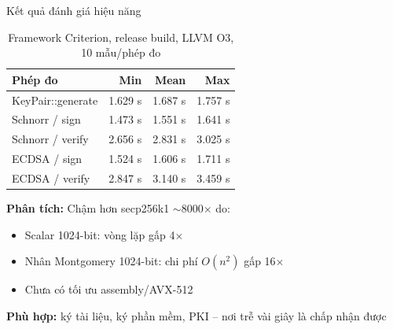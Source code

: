 \begin{frame}{Kết quả đánh giá hiệu năng}
  \begin{table}
    \begin{tabular}{lrrr}
      \toprule
      Phép đo & Min & Mean & Max \\
      \midrule
      KeyPair::generate & 1.629 s & 1.687 s & 1.757 s \\
      Schnorr / sign    & 1.473 s & 1.551 s & 1.641 s \\
      Schnorr / verify  & 2.656 s & 2.831 s & 3.025 s \\
      ECDSA / sign      & 1.524 s & 1.606 s & 1.711 s \\
      ECDSA / verify    & 2.847 s & 3.140 s & 3.459 s \\
      \bottomrule
    \end{tabular}
    \caption{Framework Criterion, release build, LLVM O3, 10 mẫu/phép đo}
  \end{table}
  \textbf{Phân tích:} Chậm hơn secp256k1 $\sim$8000$\times$ do:
  \begin{itemize}
    \item Scalar 1024-bit: vòng lặp gấp 4$\times$
    \item Nhân Montgomery 1024-bit: chi phí $O(n^2)$ gấp 16$\times$
    \item Chưa có tối ưu assembly/AVX-512
  \end{itemize}
  \textbf{Phù hợp:} ký tài liệu, ký phần mềm, PKI -- nơi trễ vài giây là chấp nhận được
\end{frame}

